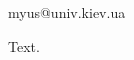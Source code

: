 \documentclass{vmsta}
\begin{document}
\author[a]{}\email
{myus@univ.kiev.ua}
\author[b]{}
\address[a]{Univ A}
\address[b]{Univ B}
\maketitle
Text.
\end{document}
